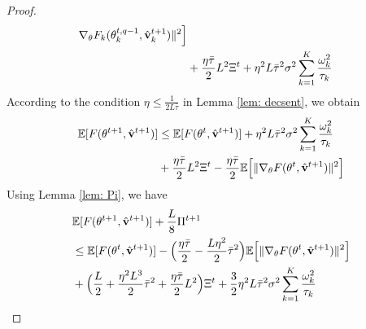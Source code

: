 \documentclass[twoside,journal]{IEEEtran}
\def\VectorFont{\bf}
\newcommand{\vv}{{\VectorFont v}}
\begin{document}
\begin{proof}
\begin{align}
\nabla_{\theta} F_k(\theta_k^{t,q-1}, \hat \vv_k^{t+1} )\|^2\Big]\\
\nonumber&+\frac{\eta\bar{\tau}}{2}L^2\Xi^t+\eta^2L\bar{\tau}^2\sigma^2\sum_{k=1}^K\frac{\omega_k^2}{\tau_k}
\end{align}
According to the condition $\eta\leq \frac{1}{2L\bar{\tau}}$ in Lemma
\ref{lem: decsent}, we obtain
\begin{align}\label{eqn: theta_v}
\nonumber\mathbb{E}[F(\theta^{t+1},\hat{\vv}^{t+1})]& \leq \mathbb{E}[F(\theta^{t},\hat{\vv}^{t+1})]
+\eta^2L\bar{\tau}^2\sigma^2\sum_{k=1}^K\frac{\omega_k^2}{\tau_k}\\
&+\frac{\eta\bar{\tau}}{2}L^2\Xi^t
-\frac{\eta\bar{\tau} }{2}\mathbb{E}\Big[\|\nabla_{\theta}F(\theta^t,\hat{\vv}^{t+1})\|^2\Big]
\end{align}
 Using Lemma \ref{lem: Pi}, we have
\begin{align}\label{eqn: theta_v1}
\nonumber&\mathbb{E}[F(\theta^{t+1},\hat{\vv}^{t+1})]+\frac{L}{8}\Pi^{t+1}\\
\nonumber&\leq \mathbb{E}[F(\theta^{t},\hat{\vv}^{t+1})]
-\Big(\frac{\eta\bar{\tau} }{2}-\frac{L\eta^2}{2}\bar{\tau}^2\Big)\mathbb{E}\Big[
\|\nabla_{\theta}F(\theta^t,\hat{\vv}^{t+1})\|^2\Big]
\\
&+\Big(\frac{L}{2}+\frac{\eta^2L^3}{2}\bar{\tau}^2
+\frac{\eta\bar{\tau}}{2}L^2\Big)\Xi^t
+\frac{3}{2}\eta^2L\bar{\tau}^2\sigma^2\sum_{k=1}^K\frac{\omega_k^2}{\tau_k}%

\end{align}
\end{proof}
\end{document}

